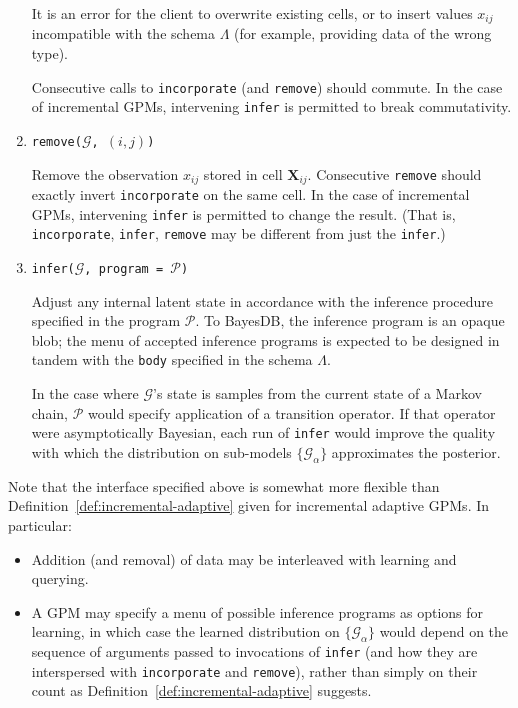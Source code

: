 \documentclass[10pt,letterpaper]{article}
\newcommand{\G}{\mathcal{G}}
\begin{document}
\begin{enumerate}
    It is an error for the client to overwrite existing cells, or to insert values
    $x_{ij}$ incompatible with the schema $\Lambda$ (for example,
    providing data of the wrong type).

    Consecutive calls to \texttt{incorporate} (and \texttt{remove})
    should commute.  In the case of incremental GPMs, intervening
    \texttt{infer} is permitted to break commutativity.

\item \texttt{remove($\G$, $(i, j)$)}

    Remove the observation $x_{ij}$ stored in cell $\mathbf{X}_{ij}$.
    Consecutive \texttt{remove} should exactly invert
    \texttt{incorporate} on the same cell.  In the case of incremental
    GPMs, intervening \texttt{infer} is permitted to change the
    result.  (That is, \texttt{incorporate}, \texttt{infer}, \texttt{remove}
    may be different from just the \texttt{infer}.)

\item \texttt{infer($\G$, program = $\mathcal{P}$)}

    Adjust any internal latent state in accordance with the inference
    procedure specified in the program $\mathcal{P}$.  To BayesDB, the
    inference program is an opaque blob; the menu of accepted
    inference programs is expected to be designed in tandem with the
    \texttt{body} specified in the schema $\Lambda$.

    In the case where $\G$'s state is samples from the current state
    of a Markov chain, $\mathcal{P}$ would specify application of a
    transition operator.  If that operator were asymptotically
    Bayesian, each run of \texttt{infer} would improve the quality
    with which the distribution on sub-models $\{\G_\alpha\}$
    approximates the posterior.
\end{enumerate}

Note that the interface specified above is somewhat more flexible than
Definition~\ref{def:incremental-adaptive} given for incremental
adaptive GPMs.  In particular:

\begin{itemize}
\item Addition (and removal) of data may be interleaved with learning
  and querying.
\item A GPM may specify a menu of possible inference programs as
  options for learning, in which case the learned distribution on
  $\{\G_\alpha\}$ would depend on the sequence of arguments passed to invocations
  of \texttt{infer} (and how they are interspersed with
  \texttt{incorporate} and \texttt{remove}), rather than simply on
  their count as Definition~\ref{def:incremental-adaptive} suggests.
\end{itemize}
\end{document}
